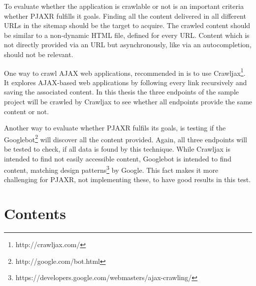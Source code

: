 \documentclass[f,bachelor,binding,twoside,palatino]{WeSTthesis}
\def \ajax {AJAX}
\def \pjaxr {PJAXR}
\begin{document}
  To evaluate whether the application is crawlable or not is an important criteria whether \pjaxr{} fulfills it goals.
  Finding all the content delivered in all different URLs in the sitemap should be the target to acquire.
  The crawled content should be similar to a non-dynamic HTML file, defined for every URL.
  Content which is not directly provided via an URL but asynchronously, like via an autocompletion, should not be relevant.

  One way to crawl \ajax{} web applications, recommended in \cite{crawljax:tweb12} is to use Crawljax\footnote{http://crawljax.com/}. 
  It explores \ajax{}-based web applications by following every link recursively and saving the associated content. In this thesis the three endpoints of the sample project will be crawled by Crawljax to see whether all endpoints provide the same content or not.
  
  Another way to evaluate whether \pjaxr{} fulfils its goals, is testing if the Googlebot\footnote{http://google.com/bot.html} will discover all the content provided.
  Again, all three endpoints will be tested to check, if all data is found by this technique.
  While Crawljax is intended to find not easily accessible content, Googlebot is intended to find content, matching design patterns\footnote{https://developers.google.com/webmasters/ajax-crawling/} by Google. This fact makes it more challenging for \pjaxr{}, not implementing these, to have good results in this test.

\section{Contents}
\end{document}
